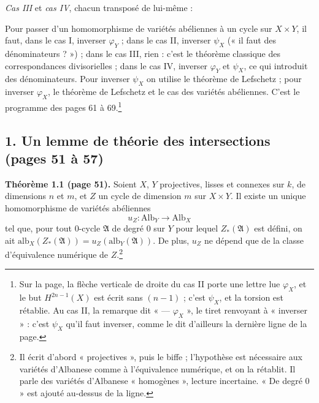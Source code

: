 \documentclass[11pt,a4paper]{article}
\begin{document}
\emph{Cas III} et \emph{cas IV}, chacun transposé de lui-même :



Pour passer d'un homomorphisme de variétés abéliennes à un cycle sur $X \times
Y$, il faut, dans le cas I, inverser $\varphi_{Y}$ ; dans le cas II, inverser
$\psi_{X}$ (« il faut des dénominateurs ? ») ; dans le cas III, rien : c'est le
théorème classique des correspondances divisorielles ; dans le cas IV, inverser
$\varphi_{Y}$ et $\psi_{X}$, ce qui introduit des dénominateurs. Pour inverser
$\psi_{X}$ on utilise le théorème de Lefschetz ; pour inverser $\varphi_{X}$, le
théorème de Lefschetz et le cas des variétés abéliennes. C'est le programme des
pages 61 à 69.\footnote{Sur la page, la flèche verticale de droite du cas II
porte une lettre lue $\varphi_{X}$, et le but $H^{2n-1}(X)$ est écrit sans
$(n-1)$ ; c'est $\psi_{X}$, et la torsion est rétablie. Au cas II, la remarque
dit « --- $\varphi_{X}$ », le tiret renvoyant à « inverser » : c'est
$\psi_{X}$ qu'il faut inverser, comme le dit d'ailleurs la dernière ligne de la
page.}

\subsection*{1. Un lemme de théorie des intersections (pages 51 à 57)}

\textbf{Théorème 1.1 (page 51).} Soient $X$, $Y$ projectives, lisses et
connexes sur $k$, de dimensions $n$ et $m$, et $Z$ un cycle de dimension $m$ sur
$X \times Y$. Il existe un unique homomorphisme de variétés abéliennes
\[
u_{Z} \colon \mathrm{Alb}_{Y} \longrightarrow \mathrm{Alb}_{X}
\]
tel que, pour tout $0$-cycle $\mathfrak{A}$ de degré $0$ sur $Y$ pour lequel
$Z_{*}(\mathfrak{A})$ est défini, on ait $\mathrm{alb}_{X}(Z_{*}(\mathfrak{A}))
= u_{Z}(\mathrm{alb}_{Y}(\mathfrak{A}))$. De plus, $u_{Z}$ ne dépend que de la
classe d'équivalence numérique de $Z$.\footnote{Il écrit d'abord
« projectives », puis le biffe ; l'hypothèse est nécessaire aux variétés
d'Albanese comme à l'équivalence numérique, et on la rétablit. Il parle des
variétés d'Albanese « homogènes », lecture incertaine. « De degré $0$ » est
ajouté au-dessus de la ligne.}
\end{document}
